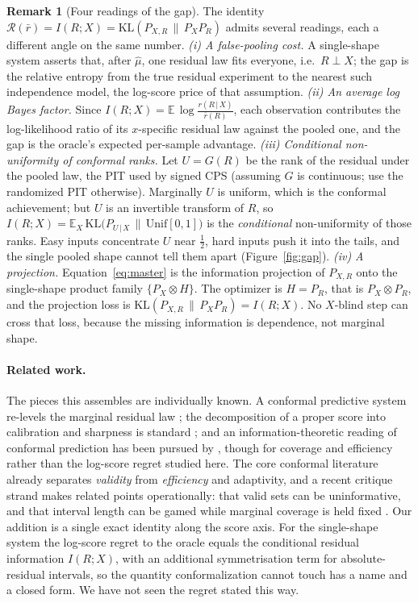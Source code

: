 \documentclass[11pt]{article}
\theoremstyle{definition}
\newtheorem{remark}{Remark}
\newcommand{\E}{\mathbb{E}}
\newcommand{\KL}{\mathrm{KL}}
\newcommand{\given}{\,\vert\,}
\begin{document}
\begin{remark}[Four readings of the gap]\label{rem:readings}
The identity $\mathcal{R}(\bar r)=I(R;X)=\KL(P_{X,R}\,\|\,P_X P_R)$ admits several readings, each a
different angle on the same number.
\emph{(i) A false-pooling cost.} A single-shape system asserts that, after $\hat\mu$, one
residual law fits everyone, i.e.\ $R\perp X$; the gap is the relative entropy from the true
residual experiment to the nearest such independence model, the log-score price of that
assumption.
\emph{(ii) An average log Bayes factor.} Since
$I(R;X)=\E\,\log\frac{r(R\given X)}{\bar r(R)}$, each observation contributes the
log-likelihood ratio of its $x$-specific residual law against the pooled one, and the gap is
the oracle's expected per-sample advantage.
\emph{(iii) Conditional non-uniformity of conformal ranks.} Let $U=G(R)$ be the rank of the
residual under the pooled law, the PIT used by signed CPS (assuming $G$ is continuous; use the
randomized PIT otherwise). Marginally $U$ is uniform, which
is the conformal achievement; but $U$ is an invertible transform of $R$, so
$I(R;X)=\E_X\,\KL\!\big(P_{U\given X}\,\|\,\mathrm{Unif}[0,1]\big)$ is the \emph{conditional}
non-uniformity of those ranks. Easy inputs concentrate $U$ near $\tfrac12$, hard inputs push
it into the tails, and the single pooled shape cannot tell them apart (Figure~\ref{fig:gap}).
\emph{(iv) A projection.} Equation~\eqref{eq:master} is the information projection of
$P_{X,R}$ onto the single-shape product family $\{P_X\otimes H\}$. The optimizer is $H=P_R$,
that is $P_X\otimes P_R$, and the projection loss is $\KL(P_{X,R}\,\|\,P_X P_R)=I(R;X)$. No
$X$-blind step can cross that loss, because the missing information is dependence, not
marginal shape.
\end{remark}

\paragraph{Related work.} The pieces this assembles are individually known. A conformal
predictive system re-levels the marginal residual law \citep{vovk2019nonparametric}; the
decomposition of a proper score into calibration and sharpness is standard
\citep{gneiting2007probabilistic}; and an information-theoretic reading of conformal
prediction has been pursued by \citet{correia2024information}, though for coverage and
efficiency rather than the log-score regret studied here. The core conformal literature
already separates \emph{validity} from \emph{efficiency} and adaptivity, and a recent
critique strand makes related points operationally: that valid sets can be uninformative,
and that interval length can be gamed while marginal coverage is held fixed
\citep{min2026coveragelength}. Our addition is a single exact identity along the score axis.
For the single-shape system the log-score regret to the oracle equals the conditional
residual information $I(R;X)$, with an additional symmetrisation term for absolute-residual
intervals, so the quantity conformalization cannot touch has a name and a closed form. We
have not seen the regret stated this way.
\end{document}
